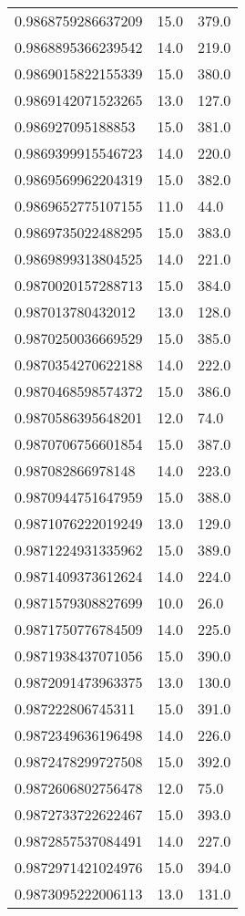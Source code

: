 \begin{center}
\begin{supertabular}[H]{p{0.30\textwidth}p{0.05\textwidth}p{0.05\textwidth}}
0.9868759286637209 & 15.0 & 379.0 \\ 
0.9868895366239542 & 14.0 & 219.0 \\ 
0.9869015822155339 & 15.0 & 380.0 \\ 
0.9869142071523265 & 13.0 & 127.0 \\ 
0.986927095188853 & 15.0 & 381.0 \\ 
0.9869399915546723 & 14.0 & 220.0 \\ 
0.9869569962204319 & 15.0 & 382.0 \\ 
0.9869652775107155 & 11.0 & 44.0 \\ 
0.9869735022488295 & 15.0 & 383.0 \\ 
0.9869899313804525 & 14.0 & 221.0 \\ 
0.9870020157288713 & 15.0 & 384.0 \\ 
0.987013780432012 & 13.0 & 128.0 \\ 
0.9870250036669529 & 15.0 & 385.0 \\ 
0.9870354270622188 & 14.0 & 222.0 \\ 
0.9870468598574372 & 15.0 & 386.0 \\ 
0.9870586395648201 & 12.0 & 74.0 \\ 
0.9870706756601854 & 15.0 & 387.0 \\ 
0.987082866978148 & 14.0 & 223.0 \\ 
0.9870944751647959 & 15.0 & 388.0 \\ 
0.9871076222019249 & 13.0 & 129.0 \\ 
0.9871224931335962 & 15.0 & 389.0 \\ 
0.9871409373612624 & 14.0 & 224.0 \\ 
0.9871579308827699 & 10.0 & 26.0 \\ 
0.9871750776784509 & 14.0 & 225.0 \\ 
0.9871938437071056 & 15.0 & 390.0 \\ 
0.9872091473963375 & 13.0 & 130.0 \\ 
0.987222806745311 & 15.0 & 391.0 \\ 
0.9872349636196498 & 14.0 & 226.0 \\ 
0.9872478299727508 & 15.0 & 392.0 \\ 
0.9872606802756478 & 12.0 & 75.0 \\ 
0.9872733722622467 & 15.0 & 393.0 \\ 
0.9872857537084491 & 14.0 & 227.0 \\ 
0.9872971421024976 & 15.0 & 394.0 \\ 
0.9873095222006113 & 13.0 & 131.0 \\ 

\end{supertabular}
\end{center}

